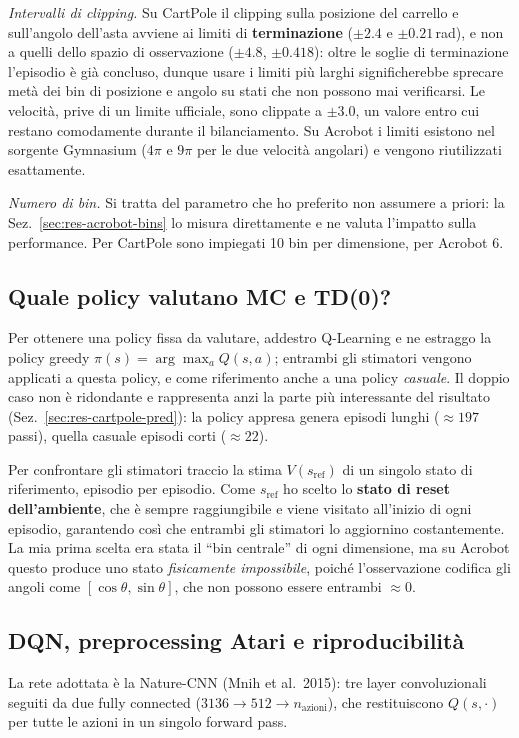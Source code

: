 \emph{Intervalli di clipping.} Su CartPole il clipping sulla posizione del carrello e
sull'angolo dell'asta avviene ai limiti di \textbf{terminazione}
($\pm 2.4$ e $\pm 0.21$\,rad), e non a quelli dello spazio di osservazione
($\pm 4.8$, $\pm 0.418$): oltre le soglie di terminazione l'episodio \`e gi\`a concluso,
dunque usare i limiti pi\`u larghi significherebbe sprecare met\`a dei bin di posizione e
angolo su stati che non possono mai verificarsi. Le velocit\`a, prive di un limite
ufficiale, sono clippate a $\pm 3.0$, un valore entro cui restano comodamente durante
il bilanciamento. Su Acrobot i limiti esistono nel sorgente Gymnasium ($4\pi$ e $9\pi$
per le due velocit\`a angolari) e vengono riutilizzati esattamente.

\emph{Numero di bin.} Si tratta del parametro che ho preferito non assumere a priori: la
Sez.~\ref{sec:res-acrobot-bins} lo misura direttamente e ne valuta l'impatto sulla
performance. Per CartPole sono impiegati 10 bin per dimensione, per Acrobot 6.

\subsection{Quale policy valutano MC e TD(0)?}
\label{sec:met-prediction}
Per ottenere una policy fissa da valutare, addestro Q\hbox{-}Learning e ne estraggo la
policy greedy $\pi(s)=\arg\max_a Q(s,a)$; entrambi gli stimatori vengono applicati a
questa policy, e come riferimento anche a una policy \emph{casuale}. Il doppio caso
non \`e ridondante e rappresenta anzi la parte pi\`u interessante del risultato
(Sez.~\ref{sec:res-cartpole-pred}): la policy appresa genera episodi lunghi
($\approx 197$ passi), quella casuale episodi corti ($\approx 22$).

Per confrontare gli stimatori traccio la stima $V(s_{\text{ref}})$ di un singolo stato
di riferimento, episodio per episodio. Come $s_{\text{ref}}$ ho scelto lo
\textbf{stato di reset dell'ambiente}, che \`e sempre raggiungibile e viene visitato
all'inizio di ogni episodio, garantendo cos\`i che entrambi gli stimatori lo aggiornino
costantemente. La mia prima scelta era stata il ``bin centrale'' di ogni dimensione,
ma su Acrobot questo produce uno stato \emph{fisicamente impossibile}, poich\'e
l'osservazione codifica gli angoli come $[\cos\theta, \sin\theta]$, che non possono
essere entrambi $\approx 0$.

\subsection{DQN, preprocessing Atari e riproducibilit\`a}
La rete adottata \`e la Nature-CNN (Mnih et al.\ 2015): tre layer convoluzionali seguiti
da due fully connected ($3136 \to 512 \to n_{\text{azioni}}$), che restituiscono
$Q(s,\cdot)$ per tutte le azioni in un singolo forward pass.

